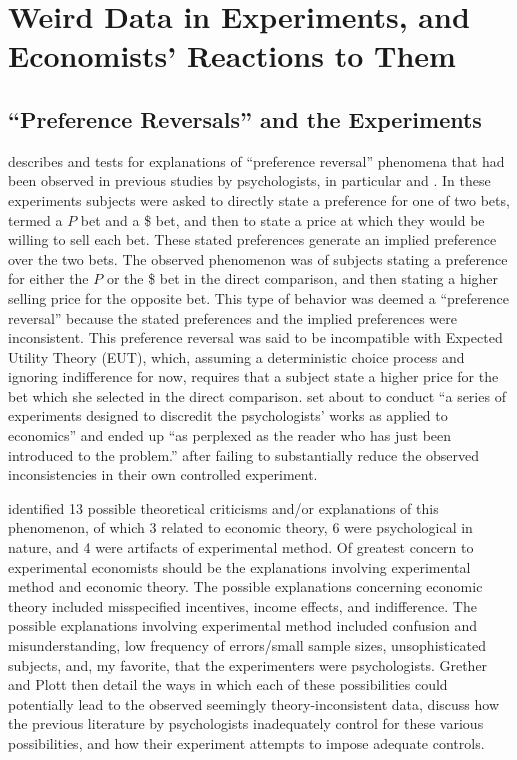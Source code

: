 \documentclass[../main.tex]{subfiles}
\begin{document}
\onehalfspacing
\setcounter{chapter}{0}
\chapter{Weird Data in Experiments, and Economists' Reactions to Them}

\lltoc

\section{\enquote{Preference Reversals} and the \texorpdfstring{\textcite{Grether1979}}{Grether \& Plott (1979)}  Experiments}

\textcite{Grether1979} describes and tests for explanations of \enquote{preference reversal} phenomena that had been observed in previous studies by psychologists, in particular \textcite{Lichtenstein1971, Lichtenstein1973} and \textcite{Lindman1971}.
In these experiments subjects were asked to directly state a preference for one of two bets, termed a $P$ bet and a {\$} bet,  and then to state a price at which they would be willing to sell each bet.
These stated preferences generate an implied preference over the two bets.
The observed phenomenon was of subjects stating a preference for either the $P$ or the {\$} bet in the direct comparison, and then stating a higher selling price for the opposite bet.
This type of behavior was deemed a \enquote{preference reversal} because the stated preferences and the implied preferences were inconsistent.
This preference reversal was said to be incompatible with Expected Utility Theory (EUT), which, assuming a deterministic choice process and ignoring indifference for now, requires that a subject state a higher price for the bet which she selected in the direct comparison.
\textcite[623]{Grether1979} set about to conduct \enquote{a series of experiments designed to discredit the psychologists' works as applied to economics} and ended up \enquote{as perplexed as the reader who has just been introduced to the problem.} \parencite*[624]{Grether1979} after failing to substantially reduce the observed inconsistencies in their own controlled experiment.

\textcite{Grether1979} identified 13 possible theoretical criticisms and/or explanations of this phenomenon, of which 3 related to economic theory, 6 were psychological in nature, and 4 were artifacts of experimental method.
Of greatest concern to experimental economists should be the explanations involving experimental method and economic theory.
The possible explanations concerning economic theory included misspecified incentives, income effects, and indifference.
The possible explanations involving experimental method included confusion and misunderstanding, low frequency of errors/small sample sizes, unsophisticated subjects, and, my favorite, that the experimenters were psychologists.
Grether and Plott then detail the ways in which each of these possibilities could potentially lead to the observed seemingly theory-inconsistent data, discuss how the previous literature by psychologists inadequately control for these various possibilities, and how their experiment attempts to impose adequate controls.
\end{document}
